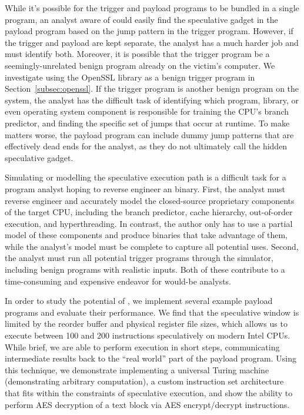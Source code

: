 While it's possible for the trigger and payload programs to be bundled in a
single program, an analyst aware of \speculake could easily find the speculative
gadget in the payload program based on the jump pattern in the trigger program.
However, if the trigger and payload are kept separate, the analyst has a much
harder job and must identify both.
Moreover, it is possible that the trigger program be a
seemingly-unrelated benign program already on the victim's computer. We
investigate using the OpenSSL library as a benign trigger
program in Section~\ref{subsec:openssl}. If the trigger program is another benign
program on the system, the analyst has the difficult task of identifying which
program, library, or even operating system component is responsible for training
the CPU's branch predictor, and finding the specific set of jumps that occur at
runtime. To make matters worse, the payload program can include dummy jump
patterns that are effectively dead ends for the analyst, as they do not
ultimately call the hidden speculative gadget.


Simulating or modelling the speculative execution path is a difficult task for a
program analyst hoping to reverse engineer an \speculake binary. First, the
analyst must reverse engineer and accurately model the closed-source proprietary
components of the target CPU, including the branch predictor, cache hierarchy,
out-of-order execution, and hyperthreading. In contrast, the \speculake
author only has to use a partial model of these components and produce binaries
that take advantage of them, while the analyst's model must be complete to
capture all potential \speculake uses. Second, the analyst must run all
potential trigger programs through the simulator, including benign programs with
realistic inputs. Both of these contribute to a time-consuming and expensive
endeavor for would-be analysts.

In order to study the potential of \speculake, we implement several example
payload programs and evaluate their performance. We find that the speculative
window is limited by the reorder buffer and physical register file sizes, which
allows us to execute between 100 and 200 instructions speculatively on modern
Intel CPUs. While brief, we are able to perform execution in short steps,
communicating intermediate results back to the ``real world'' part of the
payload program. Using this technique, we demonstrate implementing a universal
Turing machine (demonstrating arbitrary computation), a custom instruction set
architecture that fits within the constraints of speculative execution, and show
the ability to perform AES decryption of a text block via AES encrypt/decrypt
instructions.

